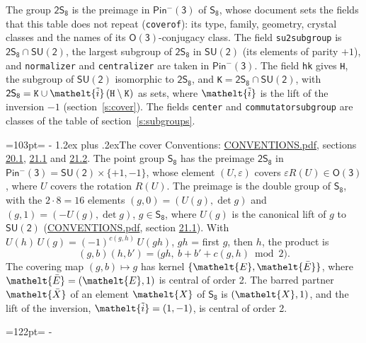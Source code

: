 \documentclass[10pt,a4paper]{article}
\makeatletter
\renewcommand\section{\@startsection{section}{1}{\z@}{-3ex plus -1ex minus -.2ex}%
  {1.2ex plus .2ex}{\normalfont\large\sffamily\bfseries\color{parttitle}}}
\newcommand{\needspace}[1]{\par\penalty-100\begingroup\dimen0=#1\relax\dimen2=\pagegoal
  \advance\dimen2-\pagetotal\ifdim\dimen0>\dimen2\relax\ifdim\dimen2>0pt\vfil\break\fi\fi
  \endgroup}
\numberwithin{equation}{section}
\newcommand{\eltfont}[1]{{\let\sigma\eltsigma\mathelt{#1}}}
\newcommand{\grp}[1]{\mathsf{#1}}
\newcommand{\elt}[1]{\eltfont{#1}}
\newcommand{\dirprod}{\times}
\newcommand{\barred}[1]{\bar{#1}}
\newcommand{\lift}[1]{\tilde{#1}}
\makeatother
\begin{document}
\leavevmode\label{n:element.inversion}\label{n:group.preimage}The group $\grp{2S_{8}}$ is the preimage in $\grp{Pin^{-}(3)}$ of \href{../../../rotation/data/pdf/S8.pdf}{$\grp{S_{8}}$}, whose document sets the fields that this table does not repeat (\texttt{coverof}): its type, family, geometry, crystal classes and the names of its \href{../../../rotation/data/pdf/O3.pdf}{$\grp{O(3)}$}-conjugacy class. The field \texttt{su2subgroup} is $\grp{2S_{8}} \cap \grp{SU(2)}$, the largest subgroup of $\grp{2S_{8}}$ in $\grp{SU(2)}$ (its elements of parity $+1$), and \texttt{normalizer} and \texttt{centralizer} are taken in $\grp{Pin^{-}(3)}$. The field \texttt{hk} gives \texttt{H}, the subgroup of $\grp{SU(2)}$ isomorphic to $\grp{2S_{8}}$, and \texttt{K}${} = \grp{2S_{8}} \cap \grp{SU(2)}$, with $\grp{2S_{8}} = \texttt{K} \cup \elt{\lift{i}}\,(\texttt{H} \setminus \texttt{K})$ as sets, where $\elt{\lift{i}}$ is the lift of the inversion $-1$ (section~\ref{s:cover}). The fields \texttt{center} and \texttt{commutatorsubgroup} are classes of the table of section~\ref{s:subgroups}.
\needspace{103pt}
\section{The cover}\label{s:cover}
Conventions: \href{../../CONVENTIONS.pdf}{CONVENTIONS.pdf}, sections \href{../../CONVENTIONS.pdf\#conv.20.1}{20.1}, \href{../../CONVENTIONS.pdf\#conv.21.1}{21.1} and \href{../../CONVENTIONS.pdf\#conv.21.2}{21.2}.
\leavevmode\label{n:group.pin.minus}\label{n:group.su2}\label{n:local.pin.sign}\label{n:matrix.covered}\label{n:matrix.lift.su2}\label{n:index.bar}The point group $\grp{S_{8}}$ has the preimage $\grp{2S_{8}}$ in $\grp{Pin^{-}(3)} = \grp{SU(2)} \dirprod \{+1, -1\}$, whose element $(U, \varepsilon)$ covers $\varepsilon R(U) \in \grp{O(3)}$, where $U$ covers the rotation $R(U)$. The preimage is the double group of $\grp{S_{8}}$, with the $2 \cdot 8 = 16$ elements $(g, 0) = (U(g), \det g)$ and $(g, 1) = (-U(g), \det g)$, $g \in \grp{S_{8}}$, where $U(g)$ is the canonical lift of $g$ to $\grp{SU(2)}$ (\href{../../CONVENTIONS.pdf}{CONVENTIONS.pdf}, section \href{../../CONVENTIONS.pdf\#conv.21.1}{21.1}). \label{n:function.cocycle}With $U(h)\,U(g) = (-1)^{c(g,h)}\,U(gh)$, $gh$ = first $g$, then $h$, the product is
\begin{equation}\label{e:product}(g, b)(h, b') = \bigl(gh,\ b + b' + c(g, h) \bmod 2\bigr).\end{equation}
\leavevmode\label{n:mark.bar}The covering map $(g, b) \mapsto g$ has kernel $\{\elt{E}, \elt{\barred{E}}\}$, where $\elt{\barred{E}} = (\elt{E}, 1)$ is central of order 2. \label{n:element.named}\label{n:mark.lift}The barred partner $\elt{\barred{X}}$ of an element $\elt{X}$ of $\grp{S_{8}}$ is $(\elt{X}, 1)$, and the lift of the inversion, $\elt{\lift{i}} = (1, -1)$, is central of order 2.
\needspace{122pt}
\end{document}
